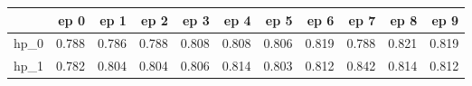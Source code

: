 \begin{tabular}{lrrrrrrrrrr}
\toprule
{} &   ep 0 &   ep 1 &   ep 2 &   ep 3 &   ep 4 &   ep 5 &   ep 6 &   ep 7 &   ep 8 &   ep 9 \\
\midrule
hp\_0 &  0.788 &  0.786 &  0.788 &  0.808 &  0.808 &  0.806 &  0.819 &  0.788 &  0.821 &  0.819 \\
hp\_1 &  0.782 &  0.804 &  0.804 &  0.806 &  0.814 &  0.803 &  0.812 &  0.842 &  0.814 &  0.812 \\
\bottomrule
\end{tabular}

